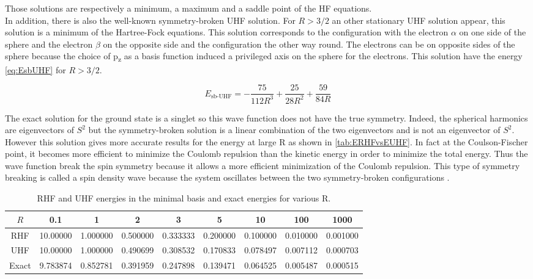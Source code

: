 \documentclass[11pt,a4paper]{article}
\begin{document}
Those solutions are respectively a minimum, a maximum and a saddle point of the HF equations.\\

In addition, there is also the well-known symmetry-broken UHF solution. For $R>3/2$ an other stationary UHF solution appear, this solution is a minimum of the Hartree-Fock equations. This solution corresponds to the configuration with the electron $\alpha$ on one side of the sphere and the electron $\beta$ on the opposite side and the configuration the other way round. The electrons can be on opposite sides of the sphere because the choice of p\textsubscript{z} as a basis function induced a privileged axis on the sphere for the electrons. This solution have the energy \eqref{eq:EsbUHF} for $R>3/2$.

\begin{equation}\label{eq:EsbUHF}
E_{\text{sb-UHF}}=-\frac{75}{112R^3}+\frac{25}{28R^2}+\frac{59}{84R}
\end{equation}

The exact solution for the ground state is a singlet so this wave function does not have the true symmetry. Indeed, the spherical harmonics are eigenvectors of $S^2$ but the symmetry-broken solution is a linear combination of the two eigenvectors and is not an eigenvector of $S^2$. However this solution gives more accurate results for the energy at large R as shown in \autoref{tab:ERHFvsEUHF}. In fact at the Coulson-Fischer point, it becomes more efficient to minimize the Coulomb repulsion than the kinetic energy in order to minimize the total energy. Thus the wave function break the spin symmetry because it allows a more efficient minimization of the Coulomb repulsion. This type of symmetry breaking is called a spin density wave because the system oscillates between the two symmetry-broken configurations \cite{GiulianiBook}.

\begin{table}[h!]
\centering
\caption{\centering RHF and UHF energies in the minimal basis and exact energies for various R.}
\begin{tabular}{ccccccccc}
\hline
\hline
$R$ & 0.1 & 1 & 2 & 3 & 5 & 10 & 100 & 1000 \\
\hline
RHF 	& 10.00000 & 1.000000 & 0.500000 & 0.333333 & 0.200000 & 0.100000 & 0.010000 & 0.001000 \\
UHF 	& 10.00000 & 1.000000 & 0.490699 & 0.308532 & 0.170833 & 0.078497 & 0.007112 & 0.000703 \\
Exact 	& 9.783874 & 0.852781 & 0.391959 & 0.247898 & 0.139471 & 0.064525 & 0.005487 & 0.000515 \\
\hline
\hline
\end{tabular}
\label{tab:ERHFvsEUHF}
\end{table}
\end{document}
